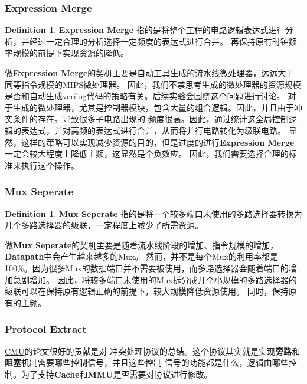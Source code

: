 \documentclass[hyperref,UTF8]{ctexart}
\theoremstyle{definition}
\newtheorem{defn}[thm]{Definition}
\theoremstyle{remark}
\numberwithin{equation}{subsection}
\newcommand{\Emph}{\textbf}
\begin{document}
\subsubsection{Expression Merge}
	
	\begin{defn}
	\label{defn:expression_merge}
	\Emph{Expression Merge} 指的是将整个工程的电路逻辑表达式进行分析，并经过一定合理的分析选择一定频度的表达式进行合并。
	再保持原有时钟频率规模的前提下实现资源的降低。
	\end{defn}
	
	做\Emph{Expression Merge}的契机主要是自动工具生成的流水线微处理器，远远大于同等指令规模的MIPS微处理器。
	因此，我们不禁思考生成的微处理器的资源规模是否和自动生成verilog代码的策略有关。后续实验会围绕这个问题进行讨论。
	对于生成的微处理器，尤其是控制器模块，包含大量的组合逻辑。因此，并且由于冲突条件的存在。导致很多子电路出现的
	频度很高。因此，通过统计这全局控制逻辑的表达式，并对高频的表达式进行合并，从而将并行电路转化为级联电路。
	显然，这样的策略可以实现减少资源的目的，但是过度的进行\Emph{Expression Merge}一定会较大程度上降低主频，这显然是个负效应。
	因此，我们需要选择合理的标准来执行这个操作。
	

\subsubsection{Mux Seperate}

	\begin{defn}
	\label{defn:mux_seperate}
	\Emph{Mux Seperate} 指的是将一个较多端口未使用的多路选择器转换为几个多路选择器的级联，一定程度上减少了所需资源。
	\end{defn}
	
	做\Emph{Mux Seperate}的契机主要是随着流水线阶段的增加、指令规模的增加，\Emph{Datapath}中会产生越来越多的Mux。
	然而，并不是每个Mux的利用率都是100\%。因为很多Mux的数据端口并不需要被使用，而多路选择器会随着端口的增加急剧增加。
	因此，将较多端口未使用的Mux拆分成几个小规模的多路选择器的级联可以在保持原有逻辑正确的前提下，较大规模降低资源使用。
	同时，保持原有的主频。

\subsubsection{Protocol Extract}

	\href{https://users.ece.cmu.edu/~jhoe/distribution/2010/nurvitadhi.pdf}{CMU}的论文很好的贡献是对
	冲突处理协议的总结。这个协议其实就是实现\Emph{旁路}和\Emph{阻塞}机制需要哪些控制信号，并且这些控制
	信号的功能都是什么，逻辑由哪些控制。为了支持\Emph{Cache}和\Emph{MMU}是否需要对协议进行修改。
\end{document}
